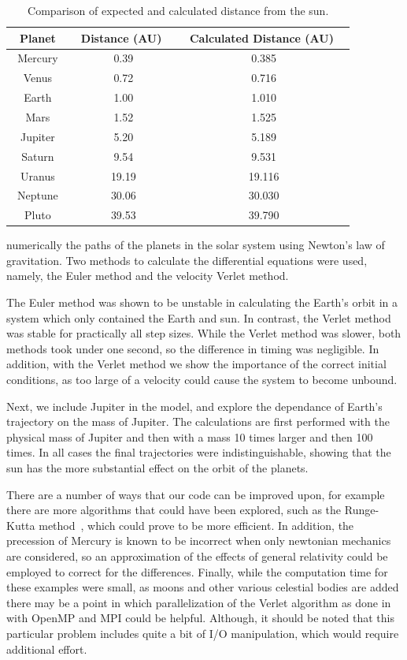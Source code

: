 \documentclass[prc,amsmath,twocolumn,superscriptaddress]{revtex4}
\begin{document}
\begin{table}[t]
\centering
\begin{tabular}{|c|c|c|}
\hline
Planet & ~Distance (AU) ~& ~Calculated Distance (AU) ~\\
\hline
Mercury&0.39 &0.385\\
Venus&0.72&0.716\\
Earth&1.00&1.010\\
Mars&1.52&1.525\\
Jupiter&5.20&5.189\\
Saturn&9.54&9.531 \\
Uranus&19.19&19.116\\
~Neptune~&30.06&30.030 \\
Pluto&39.53& 39.790\\
\hline
\end{tabular}
\caption{Comparison of expected and calculated distance from the sun.}
\label{comp}
\end{table}

\noindent numerically the paths of the planets in the solar system using Newton's law of gravitation. Two methods to calculate the differential equations were used, namely, the Euler method and the velocity Verlet method.

The Euler method was shown to be unstable in calculating the Earth's orbit in a system which only contained the Earth and sun. In contrast, the Verlet method was stable for practically all step sizes. While the Verlet method was slower, both methods took under one second, so the difference in timing was negligible. In addition, with the Verlet method we show the importance of the correct initial conditions, as too large of a velocity could cause the system to become unbound.

Next, we include Jupiter in the model, and explore the dependance of Earth's trajectory on the mass of Jupiter. The calculations are first performed with the physical mass of Jupiter and then with a mass 10 times larger and then 100 times. In all cases the final trajectories were indistinguishable, showing that the sun has the more substantial effect on the orbit of the planets.

There are a number of ways that our code can be improved upon, for example there are more algorithms that could have been explored, such as the Runge-Kutta method~\cite{RK}, which could prove to be more efficient. In addition, the precession of Mercury is known to be incorrect when only newtonian mechanics are considered, so an approximation of the effects of general relativity could be employed to correct for the differences. Finally, while the computation time for these examples were small, as moons and other various celestial bodies are added there may be a point in which parallelization of the Verlet algorithm as done in~\cite{omp} with OpenMP and MPI could be helpful. Although, it should be noted that this particular problem includes quite a bit of I/O manipulation, which would require additional effort.
\end{document}
